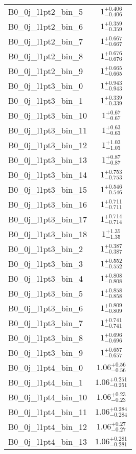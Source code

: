 \begin{tabular}{|l|c|}
B0\_0j\_l1pt2\_bin\_5 & $1^{+0.406}_{-0.406}$ \\
B0\_0j\_l1pt2\_bin\_6 & $1^{+0.359}_{-0.359}$ \\
B0\_0j\_l1pt2\_bin\_7 & $1^{+0.667}_{-0.667}$ \\
B0\_0j\_l1pt2\_bin\_8 & $1^{+0.676}_{-0.676}$ \\
B0\_0j\_l1pt2\_bin\_9 & $1^{+0.665}_{-0.665}$ \\
B0\_0j\_l1pt3\_bin\_0 & $1^{+0.943}_{-0.943}$ \\
B0\_0j\_l1pt3\_bin\_1 & $1^{+0.339}_{-0.339}$ \\
B0\_0j\_l1pt3\_bin\_10 & $1^{+0.67}_{-0.67}$ \\
B0\_0j\_l1pt3\_bin\_11 & $1^{+0.63}_{-0.63}$ \\
B0\_0j\_l1pt3\_bin\_12 & $1^{+1.03}_{-1.03}$ \\
B0\_0j\_l1pt3\_bin\_13 & $1^{+0.87}_{-0.87}$ \\
B0\_0j\_l1pt3\_bin\_14 & $1^{+0.753}_{-0.753}$ \\
B0\_0j\_l1pt3\_bin\_15 & $1^{+0.546}_{-0.546}$ \\
B0\_0j\_l1pt3\_bin\_16 & $1^{+0.711}_{-0.711}$ \\
B0\_0j\_l1pt3\_bin\_17 & $1^{+0.714}_{-0.714}$ \\
B0\_0j\_l1pt3\_bin\_18 & $1^{+1.35}_{-1.35}$ \\
B0\_0j\_l1pt3\_bin\_2 & $1^{+0.387}_{-0.387}$ \\
B0\_0j\_l1pt3\_bin\_3 & $1^{+0.552}_{-0.552}$ \\
B0\_0j\_l1pt3\_bin\_4 & $1^{+0.808}_{-0.808}$ \\
B0\_0j\_l1pt3\_bin\_5 & $1^{+0.858}_{-0.858}$ \\
B0\_0j\_l1pt3\_bin\_6 & $1^{+0.809}_{-0.809}$ \\
B0\_0j\_l1pt3\_bin\_7 & $1^{+0.741}_{-0.741}$ \\
B0\_0j\_l1pt3\_bin\_8 & $1^{+0.696}_{-0.696}$ \\
B0\_0j\_l1pt3\_bin\_9 & $1^{+0.657}_{-0.657}$ \\
B0\_0j\_l1pt4\_bin\_0 & $1.06^{+0.56}_{-0.56}$ \\
B0\_0j\_l1pt4\_bin\_1 & $1.06^{+0.251}_{-0.251}$ \\
B0\_0j\_l1pt4\_bin\_10 & $1.06^{+0.23}_{-0.23}$ \\
B0\_0j\_l1pt4\_bin\_11 & $1.06^{+0.284}_{-0.284}$ \\
B0\_0j\_l1pt4\_bin\_12 & $1.06^{+0.27}_{-0.27}$ \\
B0\_0j\_l1pt4\_bin\_13 & $1.06^{+0.281}_{-0.281}$ \\

\end{tabular}
